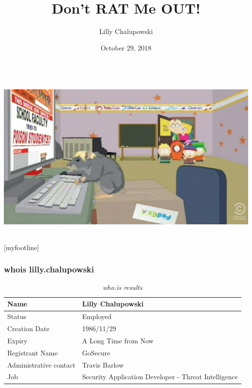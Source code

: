 \documentclass[aspectratio=169]{beamer}
\title{Don't RAT Me OUT!}
\institute{GoSecure}
\author{Lilly Chalupowski}
\date{October 29, 2018}
\begin{document}
\begin{frame}[t]
  \begin{center}
    \begingroup
    \fontsize{20pt}{20pt}\selectfont
    \inserttitle \\
    \endgroup
    \bigskip
    \includegraphics[scale=0.48]{wikileaks} \\
    \bigskip
    \insertauthor \\
    \insertdate
  \end{center}
\end{frame}

[myfootline]

\begin{frame}
  \frametitle{whois lilly.chalupowski}
  \begin{table}
    \caption{\textit{who.is results}}
    \begin{tabularx}{\textwidth}{|X|X|}
      \hline
      Name & Lilly Chalupowski \\
      \hline
      Status & Employed \\
      \hline
      Creation Date & 1986/11/29 \\
      \hline
      Expiry & A Long Time from Now \\
      \hline
      Registrant Name & GoSecure \\
      \hline
      Administrative contact & Travis Barlow \\
      \hline
      Job & Security Application Developer - Threat Intelligence \\
      \hline
    \end{tabularx}
  \end{table}
\end{frame}
\end{document}
